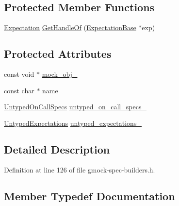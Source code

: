 \subsection*{Protected Member Functions}
\begin{DoxyCompactItemize}
\item 
\hyperlink{classtesting_1_1_expectation}{Expectation} \hyperlink{classtesting_1_1internal_1_1_untyped_function_mocker_base_a7705611c4a63df16cddb0674878c403a}{Get\+Handle\+Of} (\hyperlink{classtesting_1_1internal_1_1_expectation_base}{Expectation\+Base} $\ast$exp)
\end{DoxyCompactItemize}
\subsection*{Protected Attributes}
\begin{DoxyCompactItemize}
\item 
const void $\ast$ \hyperlink{classtesting_1_1internal_1_1_untyped_function_mocker_base_adf35c589969bb985668616031cb9ed56}{mock\+\_\+obj\+\_\+}
\item 
const char $\ast$ \hyperlink{classtesting_1_1internal_1_1_untyped_function_mocker_base_a2d472077b9a8d3758caaec5770259f70}{name\+\_\+}
\item 
\hyperlink{classtesting_1_1internal_1_1_untyped_function_mocker_base_a29cc87ed60ad0218432aa777abba7dbb}{Untyped\+On\+Call\+Specs} \hyperlink{classtesting_1_1internal_1_1_untyped_function_mocker_base_aed2a1913f6c03fd47c8900039556be34}{untyped\+\_\+on\+\_\+call\+\_\+specs\+\_\+}
\item 
\hyperlink{classtesting_1_1internal_1_1_untyped_function_mocker_base_a36480bd395e110b4eae5b0d0402de966}{Untyped\+Expectations} \hyperlink{classtesting_1_1internal_1_1_untyped_function_mocker_base_aae4a42a4bace1fcb0cd4bdf1ddd40277}{untyped\+\_\+expectations\+\_\+}
\end{DoxyCompactItemize}


\subsection{Detailed Description}


Definition at line 126 of file gmock-\/spec-\/builders.\+h.



\subsection{Member Typedef Documentation}
